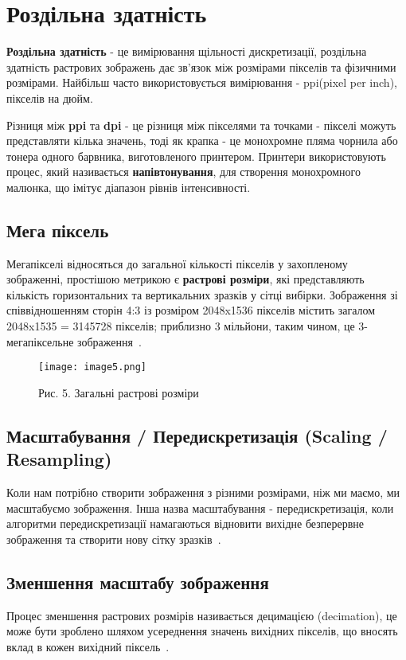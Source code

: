 \chapter{Роздільна здатність}\label{cha:resolution}
\textbf{Роздільна здатність} - це вимірювання щільності дискретизації, роздільна здатність растрових зображень дає зв'язок між розмірами пікселів та фізичними розмірами.
Найбільш часто використовується вимірювання - ppi(pixel per inch), пікселів на дюйм.

Різниця між \textbf{ppi} та \textbf{dpi} - це різниця між пікселями та точками - пікселі можуть представляти кілька значень, тоді як крапка - це монохромне пляма чорнила або тонера одного барвника, виготовленого принтером.
Принтери використовують процес, який називається \textbf{напівтонування}, для створення монохромного малюнка, що імітує діапазон рівнів інтенсивності.

\section{Мега піксель}\label{sec:megapixels}
Мегапікселі відносяться до загальної кількості пікселів у захопленому зображенні, простішою метрикою є \textbf{растрові розміри}, які представляють кількість горизонтальних та вертикальних зразків у сітці вибірки.
Зображення зі співвідношенням сторін 4:3 із розміром 2048x1536 пікселів містить загалом 2048x1535 = 3145728 пікселів;
приблизно 3 мільйони, таким чином, це 3-мегапіксельне зображення~\cite{gimp:1}.

\begin{figure}
    \label{fig:image5}
    \centering
    \texttt{[image: image5.png]}

    Рис. 5. Загальні растрові розміри
\end{figure}

\section{Масштабування / Передискретизація (Scaling / Resampling)}\label{sec:scaling_resampling}
Коли нам потрібно створити зображення з різними розмірами, ніж ми маємо, ми масштабуємо зображення.
Інша назва масштабування - передискретизація, коли алгоритми передискретизації намагаються відновити вихідне безперервне зображення та створити нову сітку зразків~\cite{gimp:1}.

\section{Зменшення масштабу зображення}\label{sec:downscaling}
Процес зменшення растрових розмірів називається децимацією (decimation), це може бути зроблено шляхом усереднення значень вихідних пікселів, що вносять вклад в кожен вихідний піксель~\cite{gimp:1}.

